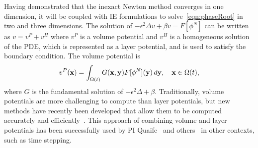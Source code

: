 Having demonstrated that the inexact Newton method converges in one
dimension, it will be coupled with IE formulations to
solve~\eqref{eqn:phaseRoot} in two and three dimensions. The solution of
$-\epsilon^2 \Delta v + \beta v = F[\phi^N]$ can be written
as $v = v^P + v^H$ where $v^P$ is a volume potential and $v^H$ is a
homogeneous solution of the PDE, which is represented as a layer
potential, and is used to satisfy the boundary condition. The volume
potential is
\begin{align*}
  v^{P}(\mathbf{x}) = \int_{\Omega(t)} G(\mathbf{x},\mathbf{y}) F[\phi^N](\mathbf{y})\, d\mathbf{y}, 
    \quad \mathbf{x} \in \Omega(t),
\end{align*}
where $G$ is the fundamental solution of $-\epsilon^2 \Delta +
\beta$. Traditionally, volume potentials are more challenging
to compute than layer potentials, but new methods have recently been
developed that allow them to be computed accurately and
efficiently~\cite{fry-leh-tor2018, and-zhu-vee2022}. This approach of
combining volume and layer potentials has been successfully used by PI
Quaife~\cite{kro-qua2010} and others~\cite{fry-kro-tor2019,
kli-ask-kro2020, che-hua-lei2005} in other contexts, such as time
stepping.



